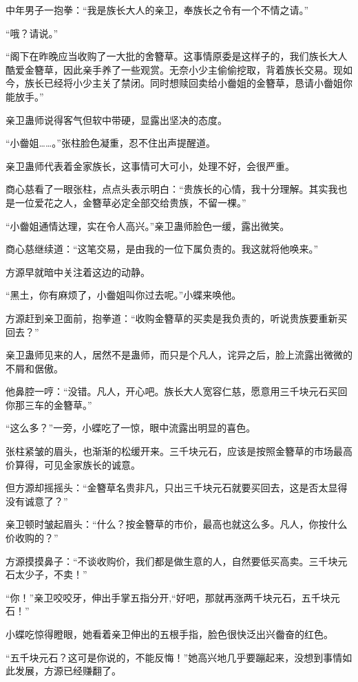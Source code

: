 \begin{this_body}
中年男子一抱拳：“我是族长大人的亲卫，奉族长之令有一个不情之请。”

“哦？请说。”

“阁下在昨晚应当收购了一大批的舍簪草。这事情原委是这样子的，我们族长大人酷爱金簪草，因此亲手养了一些观赏。无奈小少主偷偷挖取，背着族长交易。现如今，族长已经将小少主关了禁闭。同时想赎回卖给小齤姐的金簪草，恳请小齤姐你能放手。”

亲卫蛊师说得客气但软中带硬，显露出坚决的态度。

“小齤姐……。”张柱脸色凝重，忍不住出声提醒道。

亲卫蛊师代表着金家族长，这事情可大可小，处理不好，会很严重。

商心慈看了一眼张柱，点点头表示明白：“贵族长的心情，我十分理解。其实我也是一位爱花之人，金簪草必定全部交给贵族，不留一棵。”

“小齤姐通情达理，实在令人高兴。”亲卫蛊师脸色一缓，露出微笑。

商心慈继续道：“这笔交易，是由我的一位下属负责的。我这就将他唤来。”

方源早就暗中关注着这边的动静。

“黑土，你有麻烦了，小齤姐叫你过去呢。”小蝶来唤他。

方源赶到亲卫面前，抱拳道：“收购金簪草的买卖是我负责的，听说贵族要重新买回去？”

亲卫蛊师见来的人，居然不是蛊师，而只是个凡人，诧异之后，脸上流露出微微的不屑和倨傲。

他鼻腔一哼：“没错。凡人，开心吧。族长大人宽容仁慈，愿意用三千块元石买回你那三车的金簪草。”

“这么多？”一旁，小蝶吃了一惊，眼中流露出明显的喜色。

张柱紧皱的眉头，也渐渐的松缓开来。三千块元石，应该是按照金簪草的市场最高价算得，可见金家族长的诚意。

但方源却摇摇头：“金簪草名贵非凡，只出三千块元石就要买回去，这是否太显得没有诚意了？”

亲卫顿时皱起眉头：“什么？按金簪草的市价，最高也就这么多。凡人，你按什么价收购的？”

方源摸摸鼻子：“不谈收购价，我们都是做生意的人，自然要低买高卖。三千块元石太少子，不卖！”

“你！”亲卫咬咬牙，伸出手掌五指分开,“好吧，那就再涨两千块元石，五千块元石！”

小蝶吃惊得瞪眼，她看着亲卫伸出的五根手指，脸色很快泛出兴齤奋的红色。

“五千块元石？这可是你说的，不能反悔！”她高兴地几乎要蹦起来，没想到事情如此发展，方源已经赚翻了。


\end{this_body}
